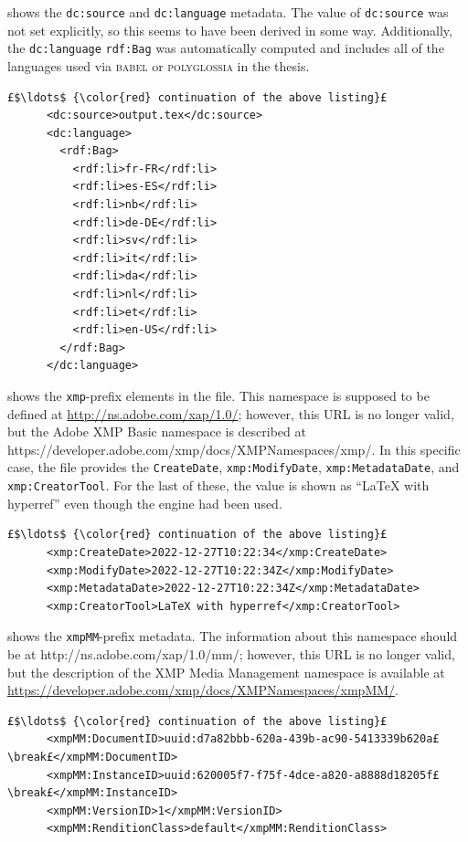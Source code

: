 \documentclass[12pt, twoside]{article}
\begin{document}
 shows the \texttt{dc:source} and \texttt{dc:language} metadata. The value of \texttt{dc:source} was not set explicitly, so this seems to have been derived in some way. Additionally, the \texttt{dc:language} \texttt{rdf:Bag} was automatically computed and includes all of the languages used via \textsc{babel} or \textsc{polyglossia} in the thesis.
\begin{lstlisting}[style=myXML,
caption={{The \texttt{dc:source} and \texttt{dc:language} metadata embedded in a PDF file}}, label={lst:pdfinfoOutputPart11}]
£$\ldots$ {\color{red} continuation of the above listing}£ 
      <dc:source>output.tex</dc:source>
      <dc:language>
        <rdf:Bag>
          <rdf:li>fr-FR</rdf:li>
          <rdf:li>es-ES</rdf:li>
          <rdf:li>nb</rdf:li>
          <rdf:li>de-DE</rdf:li>
          <rdf:li>sv</rdf:li>
          <rdf:li>it</rdf:li>
          <rdf:li>da</rdf:li>
          <rdf:li>nl</rdf:li>
          <rdf:li>et</rdf:li>
          <rdf:li>en-US</rdf:li>
        </rdf:Bag>
      </dc:language>
\end{lstlisting}

 shows the \texttt{xmp}-prefix elements in the file. This namespace is supposed to be defined at \url{http://ns.adobe.com/xap/1.0/}; however, this URL is no longer valid, but the Adobe XMP Basic namespace is described at https://developer.adobe.com/xmp/docs/XMPNamespaces/xmp/. In this specific case, the file provides the \texttt{CreateDate}, \texttt{xmp:ModifyDate}, \texttt{xmp:MetadataDate}, and \texttt{xmp:CreatorTool}. For the last of these, the value is shown as \enquote{LaTeX with hyperref} even though the \XeLaTeX{} engine had been used.
\begin{lstlisting}[style=myXML,
caption={The final set of metadata embedded in a PDF file}, label={lst:pdfinfoOutputPart12}]
£$\ldots$ {\color{red} continuation of the above listing}£ 
      <xmp:CreateDate>2022-12-27T10:22:34</xmp:CreateDate>
      <xmp:ModifyDate>2022-12-27T10:22:34Z</xmp:ModifyDate>
      <xmp:MetadataDate>2022-12-27T10:22:34Z</xmp:MetadataDate>
      <xmp:CreatorTool>LaTeX with hyperref</xmp:CreatorTool>
\end{lstlisting}

 shows the \texttt{xmpMM}-prefix metadata. The information about this namespace should be at http://ns.adobe.com/xap/1.0/mm/; however, this URL is no longer valid, but the description of the XMP Media Management namespace is available at \url{https://developer.adobe.com/xmp/docs/XMPNamespaces/xmpMM/}.
\begin{lstlisting}[style=myXML,
caption={{The \texttt{xmpMM}-prefix metadata embedded in a PDF file (two of the lines have been manually broken to fit the test in the margins)}}, label={lst:pdfinfoOutputPart13}]
£$\ldots$ {\color{red} continuation of the above listing}£ 
      <xmpMM:DocumentID>uuid:d7a82bbb-620a-439b-ac90-5413339b620a£\break£</xmpMM:DocumentID>
      <xmpMM:InstanceID>uuid:620005f7-f75f-4dce-a820-a8888d18205f£\break£</xmpMM:InstanceID>
      <xmpMM:VersionID>1</xmpMM:VersionID>
      <xmpMM:RenditionClass>default</xmpMM:RenditionClass>
\end{lstlisting}
\end{document}
